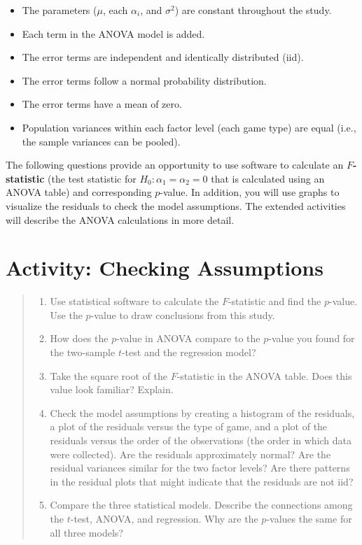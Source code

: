 \documentclass[
]{report}
\providecommand{\tightlist}{%
  \setlength{\itemsep}{0pt}\setlength{\parskip}{0pt}}
\begin{document}
\begin{itemize}
\tightlist
\item
  The parameters (\(\mu\), each \(\alpha_i\), and \(\sigma^2\)) are constant throughout the study.
\item
  Each term in the ANOVA model is added.
\item
  The error terms are independent and identically distributed (iid).
\item
  The error terms follow a normal probability distribution.
\item
  The error terms have a mean of zero.
\item
  Population variances within each factor level (each game type) are equal (i.e., the sample variances can be pooled).
\end{itemize}

The following questions provide an opportunity to use software to calculate an \textbf{\(F\)-statistic} (the test statistic for \(H_0: \alpha_1 = \alpha_2 = 0\) that is calculated using an ANOVA table) and corresponding \(p\)-value. In addition, you will use graphs to visualize the residuals to check the model assumptions. The extended activities will describe the ANOVA calculations in more detail.

\section*{Activity: Checking Assumptions}\label{activity-checking-assumptions}

\begin{quote}
\begin{enumerate}
\def\labelenumi{\arabic{enumi}.}
\setcounter{enumi}{22}
\tightlist
\item
  Use statistical software to calculate the \(F\)-statistic and find the \(p\)-value. Use the \(p\)-value to draw conclusions from this study.
\item
  How does the \(p\)-value in ANOVA compare to the \(p\)-value you found for the two-sample \(t\)-test and the regression model?
\item
  Take the square root of the \(F\)-statistic in the ANOVA table. Does this value look familiar? Explain.
\item
  Check the model assumptions by creating a histogram of the residuals, a plot of the residuals versus the type of game, and a plot of the residuals versus the order of the observations (the order in which data were collected). Are the residuals approximately normal? Are the residual variances similar for the two factor levels? Are there patterns in the residual plots that might indicate that the residuals are not iid?
\item
  Compare the three statistical models. Describe the connections among the \(t\)-test, ANOVA, and regression. Why are the \(p\)-values the same for all three models?
\end{enumerate}
\end{quote}
\end{document}
